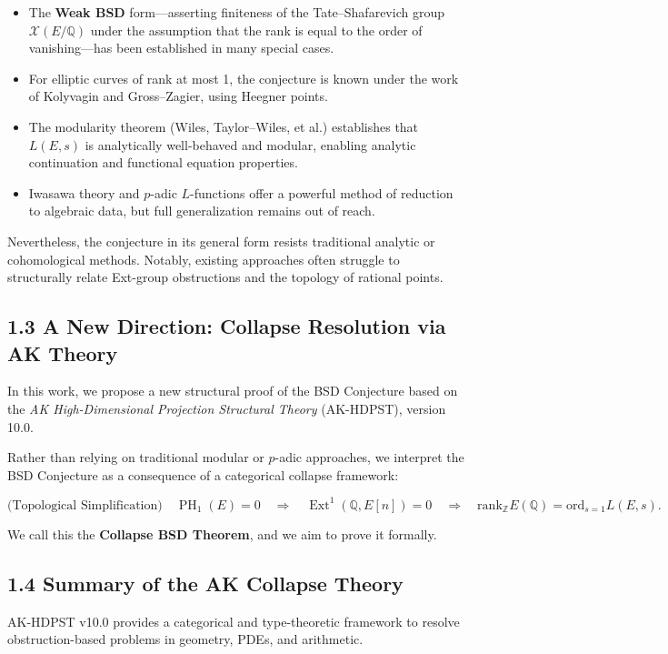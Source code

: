 \documentclass[11pt]{article}
\DeclareMathOperator{\Ext}{Ext}
\DeclareMathOperator{\PH}{PH}
\newcommand{\QQ}{\mathbb{Q}}
\newcommand{\ZZ}{\mathbb{Z}}
\newcommand{\Sha}{\mathcal{X}}
\begin{document}
\begin{itemize}
  \item The \textbf{Weak BSD} form—asserting finiteness of the Tate–Shafarevich group $\Sha(E/\QQ)$ under the assumption that the rank is equal to the order of vanishing—has been established in many special cases.
  \item For elliptic curves of rank at most 1, the conjecture is known under the work of Kolyvagin and Gross–Zagier, using Heegner points.
  \item The modularity theorem (Wiles, Taylor–Wiles, et al.) establishes that $L(E,s)$ is analytically well-behaved and modular, enabling analytic continuation and functional equation properties.
  \item Iwasawa theory and $p$-adic $L$-functions offer a powerful method of reduction to algebraic data, but full generalization remains out of reach.
\end{itemize}

Nevertheless, the conjecture in its general form resists traditional analytic or cohomological methods.  
Notably, existing approaches often struggle to structurally relate Ext-group obstructions and the topology of rational points.

\subsection{1.3 A New Direction: Collapse Resolution via AK Theory}

In this work, we propose a new structural proof of the BSD Conjecture based on the \emph{AK High-Dimensional Projection Structural Theory} (AK-HDPST), version 10.0.

Rather than relying on traditional modular or $p$-adic approaches, we interpret the BSD Conjecture as a consequence of a categorical collapse framework:

\[
\text{(Topological Simplification)} \quad \PH_1(E) = 0
\quad \Longrightarrow \quad
\Ext^1(\QQ,E[n]) = 0
\quad \Longrightarrow \quad
\mathrm{rank}_{\ZZ} E(\QQ) = \mathrm{ord}_{s=1} L(E,s).
\]

We call this the \textbf{Collapse BSD Theorem}, and we aim to prove it formally.

\subsection{1.4 Summary of the AK Collapse Theory}

AK-HDPST v10.0 provides a categorical and type-theoretic framework to resolve obstruction-based problems in geometry, PDEs, and arithmetic.
\end{document}
